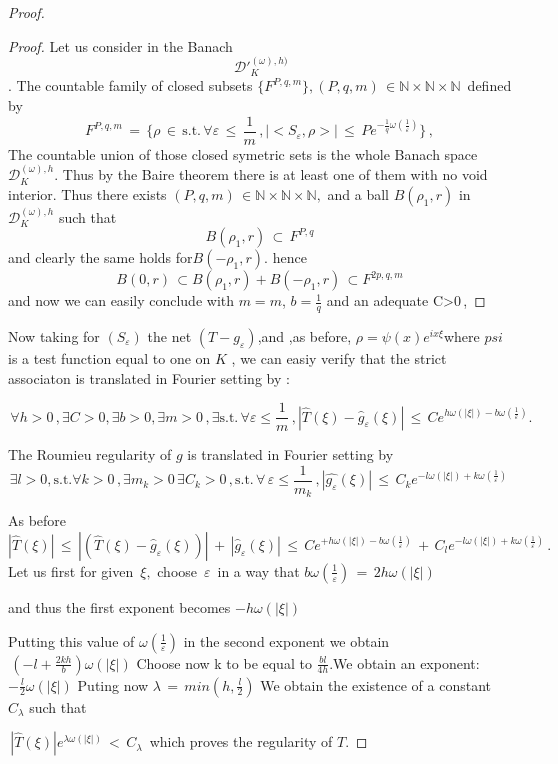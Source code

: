 \documentclass[12pt,a4paper]{amsart}
\newcommand{\NN}{\mathbb N}
\begin{document}
\begin{proof}
\begin{proof}

Let us consider in the Banach 
$$\,\mathcal{D}'^{(\omega),h)}_K
 $$.
  The countable family of closed subsets
  $\{ F^{P,q,m}\} ,(P,q,m)\,\in\NN\times\NN \times\NN\, $
  defined by
  $$ F^{P,q,m}\,=\,\{\rho\,\in\,
  \mbox{s.t.}\,
  \forall \varepsilon \,\leq \,\frac{1}{m}\,,
 | <S_\varepsilon,\rho> |\,\leq\,
Pe^{-\frac{1}{q}\omega(\frac{1}{\varepsilon})}\}\,,$$
 The countable union of those closed symetric sets is the whole Banach space $\mathcal{D}^{(\omega),h}_K$. Thus by the Baire theorem there is at least one of them with no void interior. Thus there exists 
 $(P,q,m)\,\in\NN\times\NN\times \NN, $ and a ball $B(\rho_1,r)$
  in $\mathcal{D}^{(\omega),h}_K$ such that 
  $$  B(\rho_1,r)\,\subset\,F^{P,q}$$
  and clearly the same holds for$B(-\rho_1,r).$
   hence 
   $$ B(0,r)\,\subset B(\rho_1,r)+B(-\rho_1,r)\,
   \subset F^{2p,q,m}$$ and now we can easily conclude with $ m=m$, $b=\frac{1}{q}$ and an adequate C>0\,,
   \end{proof}
   
   
   Now taking for $(S_\varepsilon)$ the net
   $( T-g_\varepsilon )$,and ,as before,   
   $\rho = \psi(x)e^{ix\xi}$where $psi$ is a test function equal to one on $K$ ,  we can easiy verify that the strict associaton is translated in Fourier setting by :
 
$$\,\forall h>0\,,\exists C>0 ,\exists b>0 , \exists m>0\,,\exists 
\mbox{s.t.}\,\forall \varepsilon \leq \frac{1}{m}\,,
|\hat{T}(\xi)-\hat{g}_\varepsilon(\xi)|\,\leq\,
 Ce^{h\omega(|\xi|)-b\omega(\frac{1}{\varepsilon})}.$$
 
 The Roumieu regularity of $g$ is translated in Fourier setting by 
$$\exists l>0,\mbox{s.t.}  \forall k>0 \,,\exists m_k >0\, \exists C_k>0\,,
\mbox{s.t.}\,\forall \,\varepsilon \leq \frac{1}{m_k}\,,
 |\hat{g_\varepsilon}(\xi)|\,\leq\,
C_ke^{-l\omega(|\xi|) + k\omega(\frac{1}{\varepsilon})}
\,$$         
 
 As before
 $$|\hat{T}(\xi)|\,\leq\,
 |(\hat{T}(\xi)- \hat{g}_\varepsilon (\xi))|\,+
 \,|\hat{g}_\varepsilon(\xi)|\,\leq
 \,Ce^{+h\omega(|\xi|)
 -b\omega(\frac{1}{\varepsilon})}\,+\,
 C_le^{-l\omega(|\xi|)+
 k\omega(\frac{1}{\varepsilon})}\,.$$ 
 Let us first for given $\,\xi, $ choose $\,\varepsilon\,$ in a way that 
 $b\omega(\frac{1}{\varepsilon})\,=\,2h\omega(|\xi|)\,
 $ 
 
 and thus the first exponent becomes $-h\omega(|\xi|)$                
 
 Putting this value of $\omega(\frac{1}{\varepsilon})$
 in the second exponent we obtain 
 $\,(-l+\frac{2kh}{b})\omega(|\xi|)$
 Choose now k to be equal to $ \frac{bl}{4h}$.We obtain an exponent:
 $-\frac{l}{2}\omega(|\xi|)$
 Puting now 
 $\lambda\,=\,min(h,\frac{l}{2})$
 We obtain the existence of a constant $C_{\lambda}$ such that 
 
 $\,|\hat{T}(\xi)|e^{\lambda\omega(|\xi|)}\,<\,C_{\lambda}\,$ 
  which proves the regularity of $T$.
 
 \end{proof}
\end{document}
